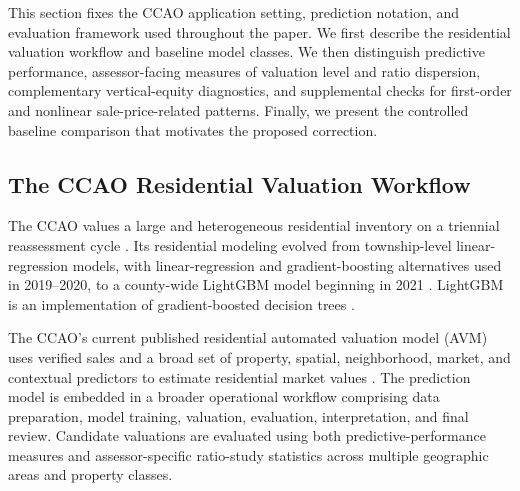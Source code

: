 \documentclass[10pt]{article}
\theoremstyle{definition}
\newcommand{\1}{\mathbf{1}}
\begin{document}

{This section fixes the CCAO application setting, prediction notation, and evaluation framework used throughout the paper. We first describe the residential valuation workflow and baseline model classes. We then distinguish predictive performance, assessor-facing measures of valuation level and ratio dispersion, complementary vertical-equity diagnostics, and supplemental checks for first-order and nonlinear sale-price-related patterns. Finally, we present the controlled baseline comparison that motivates the proposed correction.}


\subsection{The CCAO Residential Valuation Workflow}
\label{subsec:ccao_workflow}

The CCAO values a large and heterogeneous residential inventory on a triennial reassessment cycle \cite{CCAOAssessmentCalendar2026}. Its residential modeling evolved from township-level linear-regression models, with linear-regression and gradient-boosting alternatives used in 2019--2020, to a county-wide LightGBM model beginning in 2021 \cite{CCAOModelResAVM2026}. LightGBM is an implementation of gradient-boosted decision trees \cite{lightgbm}.

The CCAO's current published residential automated valuation model (AVM) uses verified sales and a broad set of property, spatial, neighborhood, market, and contextual predictors to estimate residential market values \cite{CCAOModelResAVM2026}. The prediction model is embedded in a broader operational workflow comprising data preparation, model training, valuation, evaluation, interpretation, and final review. Candidate valuations are evaluated using both predictive-performance measures and assessor-specific ratio-study statistics across multiple geographic areas and property classes.
\end{document}
